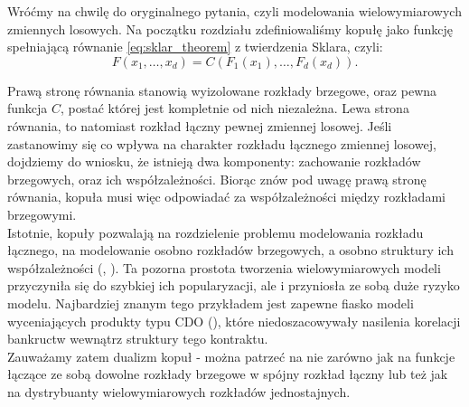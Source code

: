 Wróćmy na chwilę do oryginalnego pytania, czyli modelowania wielowymiarowych zmiennych losowych. Na początku rozdziału zdefiniowaliśmy kopułę jako funkcję spełniającą równanie \ref{eq:sklar_theorem} z twierdzenia Sklara, czyli:
$$F(x_1, \dots, x_d) = C(F_1(x_1), \dots, F_d(x_d)).$$

Prawą stronę równania stanowią wyizolowane rozkłady brzegowe, oraz pewna funkcja $C$, postać której jest kompletnie od nich niezależna. Lewa strona równania, to natomiast rozkład łączny pewnej zmiennej losowej. Jeśli zastanowimy się co wpływa na charakter rozkładu łącznego zmiennej losowej, dojdziemy do wniosku, że istnieją dwa komponenty: zachowanie rozkładów brzegowych, oraz ich współzależności. Biorąc znów pod uwagę prawą stronę równania, kopuła musi więc odpowiadać za współzależności między rozkładami brzegowymi. \\
Istotnie, kopuły pozwalają na rozdzielenie problemu modelowania rozkładu łącznego, na modelowanie osobno rozkładów brzegowych, a osobno struktury ich współzależności (\cite{Sklar_Theorem}, \cite{Joe_Multivariate_Models}). Ta pozorna prostota tworzenia wielowymiarowych modeli przyczyniła się do szybkiej ich popularyzacji, ale i przyniosła ze sobą duże ryzyko modelu. Najbardziej znanym tego przykładem jest zapewne fiasko modeli wyceniających produkty typu CDO (\cite{CDS_Copula}), które niedoszacowywały nasilenia korelacji bankructw wewnątrz struktury tego kontraktu.\\

Zauważamy zatem dualizm kopuł - można patrzeć na nie zarówno jak na funkcje łączące ze sobą dowolne rozkłady brzegowe w spójny rozkład łączny lub też jak na dystrybuanty wielowymiarowych rozkładów jednostajnych.\\